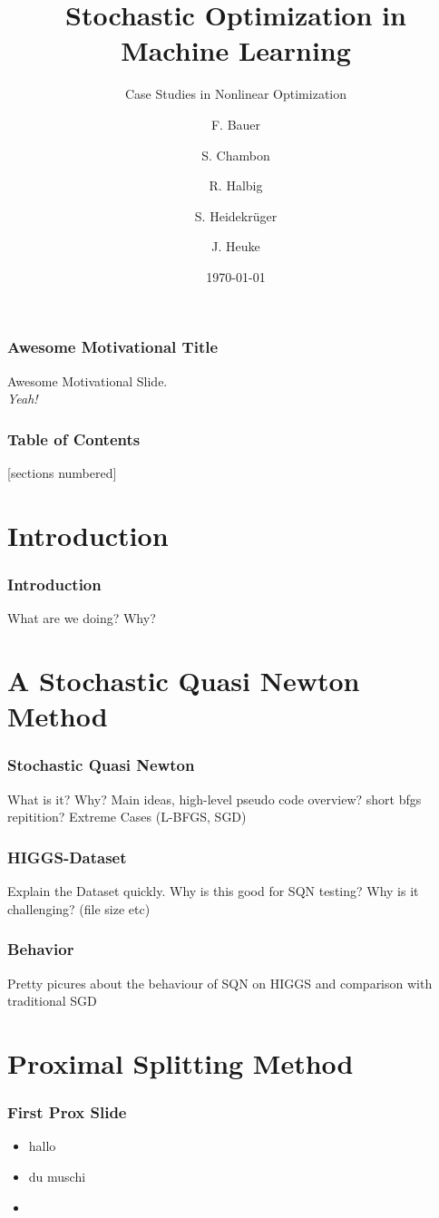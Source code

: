 \documentclass[10pt]{beamer}
\title{Stochastic Optimization in Machine Learning}
\subtitle{Case Studies in Nonlinear Optimization}
\date{\today}
\author{F. Bauer \and S. Chambon \and R. Halbig \and S. Heidekrüger \and J. Heuke}
\institute{Technische Universität München}
\begin{document}
\maketitle

\begin{frame}
  \frametitle{Awesome Motivational Title}
  Awesome Motivational Slide.\\
  \emph{Yeah!}
\end{frame}

\begin{frame}
  \frametitle{Table of Contents}
  [sections numbered]
  \tableofcontents[hideallsubsections]
\end{frame}

\section{Introduction}

  \begin{frame}
    \frametitle{Introduction}
    What are we doing?
    Why?
  \end{frame}

\section{A Stochastic Quasi Newton Method}

  \begin{frame}
    \frametitle{Stochastic Quasi Newton}
      What is it?\cite{SQN}
      Why?
      Main ideas, high-level pseudo code overview?
      short bfgs repitition?
      Extreme Cases (L-BFGS, SGD)
  \end{frame}

  \begin{frame}
    \frametitle{HIGGS-Dataset}
    Explain the Dataset quickly.
    Why is this good for SQN testing?
    Why is it challenging? (file size etc)
  \end{frame}

  \begin{frame}
    \frametitle{Behavior}
      Pretty picures about the behaviour of SQN on HIGGS
      and comparison with traditional SGD
  \end{frame}

 \section{Proximal Splitting Method}

   \begin{frame}\frametitle{First Prox Slide}
       \begin{itemize}
            \item hallo
            \item \alert{du muschi}
            \item \cite{becker2012quasi}
          \end{itemize}   
   
   \end{frame}
\end{document}
